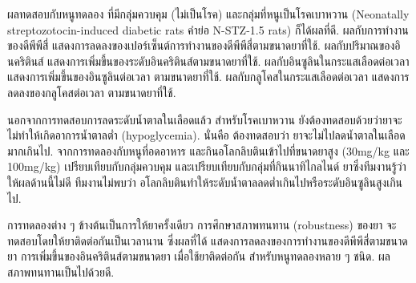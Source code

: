 {\begin{shaded}
%
% 
%

%

ผลทดสอบกับหนูทดลอง
ที่มีกลุ่มควบคุม (ไม่เป็นโรค) และกลุ่มที่หนูเป็นโรคเบาหวาน (Neonatally streptozotocin-induced diabetic rats คำย่อ N-STZ-1.5 rats)
ก็ได้ผลที่ดี.
ผลกับการทำงานของดีพีพีสี่ แสดงการลดลงของเปอร์เซ็นต์การทำงานของดีพีพีสี่ตามขนาดยาที่ใช้.
ผลกับปริมาณของอินคริตินส์ แสดงการเพิ่มขึ้นของระดับอินคริตินส์ตามขนาดยาที่ใช้.
ผลกับอินซูลินในกระแสเลือดต่อเวลา แสดงการเพิ่มขึ้นของอินซูลินต่อเวลา ตามขนาดยาที่ใช้.
ผลกับกลูโคสในกระแสเลือดต่อเวลา แสดงการลดลงของกลูโคสต่อเวลา ตามขนาดยาที่ใช้.

นอกจากการทดสอบการลดระดับน้ำตาลในเลือดแล้ว 
สำหรับโรคเบาหวาน 
ยังต้องทดสอบด้วยว่ายาจะไม่ทำให้เกิดอาการน้ำตาลต่ำ (hypoglycemia).
นั่นคือ ต้องทดสอบว่า ยาจะไม่ไปลดน้ำตาลในเลือดมากเกินไป.
จากการทดลองกับหนูที่อดอาหาร และกินอโลกลิบตินเข้าไปที่ขนาดยาสูง (30mg/kg และ 100mg/kg) เปรียบเทียบกับกลุ่มควบคุม
และเปรียบเทียบกับกลุ่มที่กินนาทิไกลไนด์ ยาซึ่งทีมงานรู้ว่าให้ผลด้านนี้ไม่ดี
ทีมงานไม่พบว่า อโลกลิบตินทำให้ระดับน้ำตาลลดต่ำเกินไปหรือระดับอินซูลินสูงเกินไป.


%
%
%

การทดลองต่าง ๆ ข้างต้นเป็นการให้ยาครั้งเดียว
การศึกษาสภาพทนทาน (robustness) ของยา
จะทดสอบโดยให้ยาติดต่อกันเป็นเวลานาน
ซึ่งผลที่ได้ แสดงการลดลงของการทำงานของดีพีพีสี่ตามขนาดยา
การเพิ่มขึ้นของอินคริตินส์ตามขนาดยา
เมื่อใช้ยาติดต่อกัน
สำหรับหนูทดลองหลาย ๆ ชนิด.
ผลสภาพทนทานเป็นไปด้วยดี.


\end{shaded}}
